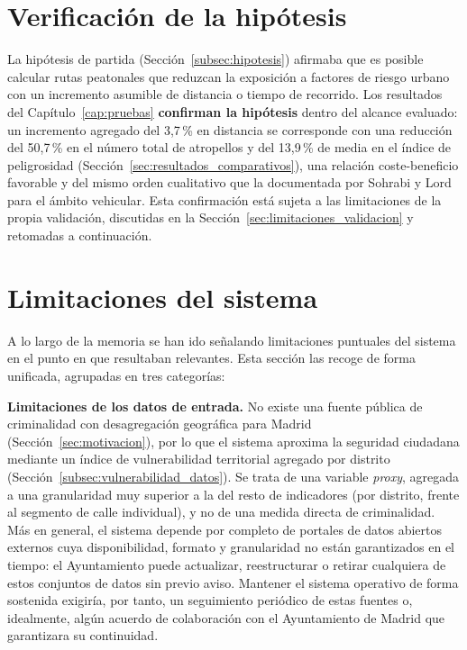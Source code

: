 \section{Verificación de la hipótesis}
\label{sec:verificacion_hipotesis}

La hipótesis de partida (Sección~\ref{subsec:hipotesis}) afirmaba que es posible calcular rutas peatonales que reduzcan la exposición a factores de riesgo urbano con un incremento asumible de distancia o tiempo de recorrido. Los resultados del Capítulo~\ref{cap:pruebas} \textbf{confirman la hipótesis} dentro del alcance evaluado: un incremento agregado del 3,7\,\% en distancia se corresponde con una reducción del 50,7\,\% en el número total de atropellos y del 13,9\,\% de media en el índice de peligrosidad (Sección~\ref{sec:resultados_comparativos}), una relación coste-beneficio favorable y del mismo orden cualitativo que la documentada por Sohrabi y Lord \cite{sohrabilord2022} para el ámbito vehicular. Esta confirmación está sujeta a las limitaciones de la propia validación, discutidas en la Sección~\ref{sec:limitaciones_validacion} y retomadas a continuación.

\section{Limitaciones del sistema}
\label{sec:limitaciones_sistema}

A lo largo de la memoria se han ido señalando limitaciones puntuales del sistema en el punto en que resultaban relevantes. Esta sección las recoge de forma unificada, agrupadas en tres categorías:

\textbf{Limitaciones de los datos de entrada.} No existe una fuente pública de criminalidad con desagregación geográfica para Madrid (Sección~\ref{sec:motivacion}), por lo que el sistema aproxima la seguridad ciudadana mediante un índice de vulnerabilidad territorial agregado por distrito (Sección~\ref{subsec:vulnerabilidad_datos}). Se trata de una variable \textit{proxy}, agregada a una granularidad muy superior a la del resto de indicadores (por distrito, frente al segmento de calle individual), y no de una medida directa de criminalidad. Más en general, el sistema depende por completo de portales de datos abiertos externos cuya disponibilidad, formato y granularidad no están garantizados en el tiempo: el Ayuntamiento puede actualizar, reestructurar o retirar cualquiera de estos conjuntos de datos sin previo aviso. Mantener el sistema operativo de forma sostenida exigiría, por tanto, un seguimiento periódico de estas fuentes o, idealmente, algún acuerdo de colaboración con el Ayuntamiento de Madrid que garantizara su continuidad.

